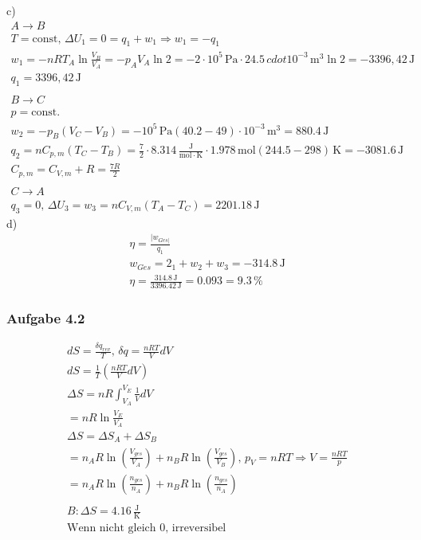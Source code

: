 \documentclass{article}
\begin{document}
c)\begin{eqnarray*}
    A\rightarrow B\\
    T =\mathrm{const},\,\Delta U_1 = 0 = q_1+w_1 \Rightarrow w_1 = -q_1\\
    w_1 = -nRT_A\ln\frac{V_B}{V_A} = -p_AV_A\ln 2 = -2\cdot 10^5 \,\mathrm{Pa} \cdot 24.5\,cdot 10^{-3}\,\mathrm{m^3}\ln 2 = -3396,42\,\mathrm{J}\\
    q_1=3396,42\,\mathrm{J}\\\\
    B\rightarrow C\\
    p = \mathrm{const.}\\
    w_2 = -p_B(V_C-V_B)=-10^5\,\mathrm{Pa}(40.2-49)\cdot 10^{-3}\,\mathrm{m^3} = 880.4\,\mathrm{J}\\
    q_2 = nC_{p,m}(T_C-T_B) = \frac{7}{2}\cdot 8.314\,\mathrm{\frac{J}{mol\cdot K}}\cdot 1.978\,\mathrm{mol}(244.5-298)\,\mathrm{K} = -3081.6\,\mathrm{J}\\
    C_{p,m}=C_{V,m}+R = \frac{7R}{2}\\\\
    C\rightarrow A\\
    q_3 = 0,\, \Delta U_3 = w_3 = nC_{V,m}(T_A-T_C)=2201.18\,\mathrm{J}
\end{eqnarray*}
d)\begin{eqnarray*}
    \eta = \frac{|w_{Ges|}}{q_1}\\
    w_{Ges} = 2_1 + w_2 + w_3 = -314.8\,\mathrm{J}\\
    \eta = \frac{314.8\,\mathrm{J}}{3396.42\,\mathrm{J}} = 0.093 = 9.3\,\%
\end{eqnarray*}

\subsubsection*{Aufgabe 4.2}
\begin{eqnarray*}
    dS = \frac{\delta q_{rev}}{T},\, \delta q =\frac{nRT}{V}dV\\
    dS = \frac{1}{T}\left(\frac{nRT}{V}dV\right)\\
    \Delta S = nR \int_{V_A}^{V_E}\frac{1}{V}dV\\
    = nR \ln \frac{V_E}{V_A}\\
    \Delta S = \Delta S_A + \Delta S_B\\
    =n_A R\ln \left(\frac{V_{ges}}{V_A}\right)+n_BR\ln\left(\frac{V_{ges}}{V_B}\right),\, p_V = nRT \Rightarrow V = \frac{nRT}{p}\\
    =n_AR\ln\left(\frac{n_{ges}}{n_A}\right)+n_BR\ln\left(\frac{n_{ges}}{n_A}\right)\\\\
    B:
    \Delta S = 4.16\,\mathrm{\frac{J}{K}}\\
    \text{Wenn nicht gleich 0, irreversibel}\\
\end{eqnarray*}
\end{document}
